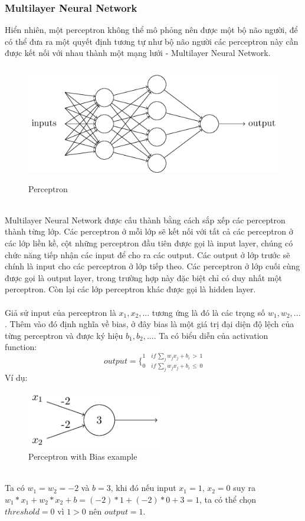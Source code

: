 \subsubsection{Multilayer Neural Network}
Hiển nhiên, một perceptron không thể mô phỏng nên được một bộ não người, để 
có thể đưa ra một quyết định tương tự như bộ não người các perceptron này cần 
được kết nối với nhau thành một mạng lưới - Multilayer Neural Network.\\
\begin{figure}[h!]
\centering
\includegraphics[height=2in, keepaspectratio=true]{multilayerneuralnetwork.png}
\caption{Perceptron}
\end{figure}\\
Multilayer Neural Network được cấu thành bằng cách sắp xếp các perceptron thành 
từng lớp. Các perceptron ở mỗi lớp sẽ kết nối với tất cả các perceptron ở các 
lớp liền kề, cột những perceptron đầu tiên được gọi là input layer, chúng có 
chức năng tiếp nhận các input để cho ra các output. Các output ở lớp trước sẽ chính là 
input cho các perceptron ở lớp tiếp theo. Các perceptron ở lớp cuối cùng được gọi là 
output layer, trong trường hợp này đặc biệt chỉ có duy nhất một perceptron. Còn 
lại các lớp perceptron khác được gọi là hidden layer.\\\\
Giả sử input của perceptron là $x_1, x_2, ...$ tương ứng là đó là các trọng 
số $w_1, w_2, ...$. Thêm vào đó định nghĩa về bias, ở đây bias là một giá trị 
đại diện độ lệch của từng perceptron và được ký hiệu $b_1, b_2, ...$. Ta có biểu diễn của activation 
function:\\
\[
  output = 
  \bigg\{
    _{0 \quad if \, \sum_j w_j x_j + b_i\, \leq \, 0}
    ^{1 \quad if \, \sum_j w_j x_j + b_i\, > \, 1}
\]
Ví dụ:\\
\begin{figure}[h!]
\centering
\includegraphics[height=1in, keepaspectratio=true]{exmln.png}
\caption{Perceptron with Bias example}
\end{figure}\\
Ta có $w_1=w_2=-2$ và $b=3$, khi đó nếu input $x_1=1,\, x_2=0$ suy ra $ 
w_1*x_1+w_2*x_2+b=(-2)*1+(-2)*0+3=1$, ta có thể chọn $threshold=0$ vì $1>0$
nên $output=1$.

